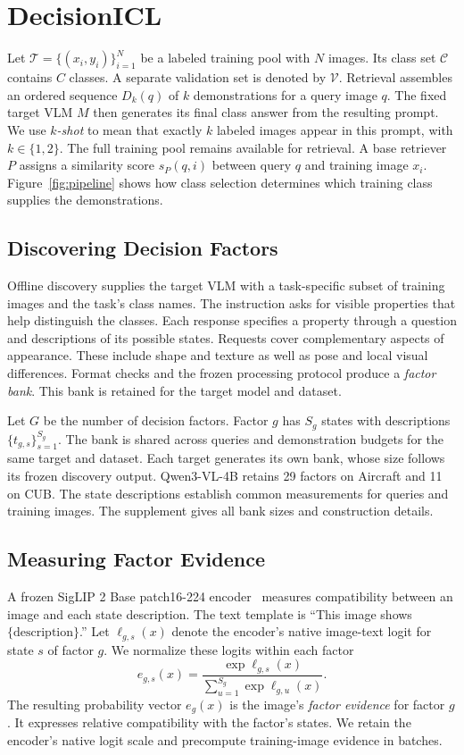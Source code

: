 \documentclass[10pt,twocolumn,letterpaper]{article}
\newcommand{\train}{\mathcal{T}}
\newcommand{\valid}{\mathcal{V}}
\newcommand{\classes}{\mathcal{C}}
\begin{document}
\section{DecisionICL}
\label{sec:method}
Let $\train=\{(x_i,y_i)\}_{i=1}^N$ be a labeled training pool with $N$ images. Its class set $\classes$ contains $C$ classes. A separate validation set is denoted by $\valid$. Retrieval assembles an ordered sequence $D_k(q)$ of $k$ demonstrations for a query image $q$. The fixed target VLM $M$ then generates its final class answer from the resulting prompt. We use \emph{$k$-shot} to mean that exactly $k$ labeled images appear in this prompt, with $k\in\{1,2\}$. The full training pool remains available for retrieval. A base retriever $P$ assigns a similarity score $s_P(q,i)$ between query $q$ and training image $x_i$. Figure~\ref{fig:pipeline} shows how class selection determines which training class supplies the demonstrations.

\subsection{Discovering Decision Factors}
\label{sec:factors}
Offline discovery supplies the target VLM with a task-specific subset of training images and the task's class names. The instruction asks for visible properties that help distinguish the classes. Each response specifies a property through a question and descriptions of its possible states. Requests cover complementary aspects of appearance. These include shape and texture as well as pose and local visual differences. Format checks and the frozen processing protocol produce a \emph{factor bank}. This bank is retained for the target model and dataset.

Let $G$ be the number of decision factors. Factor $g$ has $S_g$ states with descriptions $\{t_{g,s}\}_{s=1}^{S_g}$. The bank is shared across queries and demonstration budgets for the same target and dataset. Each target generates its own bank, whose size follows its frozen discovery output. Qwen3-VL-4B retains 29 factors on Aircraft and 11 on CUB. The state descriptions establish common measurements for queries and training images. The supplement gives all bank sizes and construction details.

\subsection{Measuring Factor Evidence}
\label{sec:evidence}
A frozen SigLIP 2 Base patch16-224 encoder~\cite{siglip2} measures compatibility between an image and each state description. The text template is ``This image shows $\{\text{description}\}$.'' Let $\ell_{g,s}(x)$ denote the encoder's native image-text logit for state $s$ of factor $g$. We normalize these logits within each factor
\begin{equation}
 e_{g,s}(x)=\frac{\exp\ell_{g,s}(x)}{\sum_{u=1}^{S_g}\exp\ell_{g,u}(x)}.
 \label{eq:evidence}
\end{equation}
The resulting probability vector $e_g(x)$ is the image's \emph{factor evidence} for factor $g$. It expresses relative compatibility with the factor's states. We retain the encoder's native logit scale and precompute training-image evidence in batches.
\end{document}
